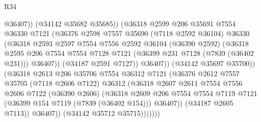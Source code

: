 \begin{lexlean}{R34}
\begin{coremodule}
                                @36407))
                            (@34142 @35682 @35685))
                          (@36318
                            @2599
                            @206
                            @35691
                            @7554
                            @36330
                            @7121
                            (@36376
                              @2598
                              @7557
                              @35690
                              (@7118 @2592 @36104)
                              @36330
                              (@36318
                                @2593
                                @2597
                                @7554
                                @7556
                                @2592
                                @36104
                                (@36390 @2592)
                                (@36318
                                  @2595
                                  @206
                                  @7554
                                  @7554
                                  @7128
                                  @7121
                                  (@36399 @231 @7128 (@7839 (@36402 @231)))
                                  @36407))
                              (@34187 @2591 @7127))
                            @36407))
                        (@34142 @35697 @35700))
                      (@36318
                        @2613
                        @206
                        @35706
                        @7554
                        @36312
                        @7121
                        (@36376
                          @2612
                          @7557
                          @35705
                          (@7118 @2606 @7122)
                          @36312
                          (@36318
                            @2607
                            @2611
                            @7554
                            @7556
                            @2606
                            @7122
                            (@36390 @2606)
                            (@36318
                              @2609
                              @206
                              @7554
                              @7554
                              @7119
                              @7121
                              (@36399 @154 @7119 (@7839 (@36402 @154)))
                              @36407))
                          (@34187 @2605 @7113))
                        @36407))
                    (@34142 @35712 @35715)))))))

\end{coremodule}
\end{lexlean}
